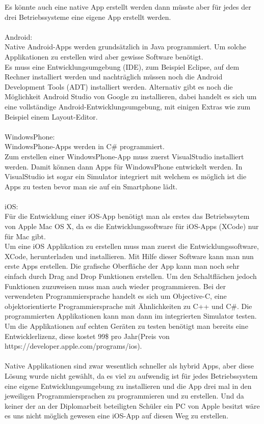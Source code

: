 Es könnte auch eine native App erstellt werden dann müsste aber für jedes der drei Betriebssysteme eine eigene App erstellt werden.\\
\\
Android:\\
Native Android-Apps werden grundsätzlich in Java programmiert. Um solche Applikationen zu erstellen wird aber gewisse Software benötigt.\\
Es muss eine Entwicklungsumgebung (IDE), zum Beispiel Eclipse, auf dem Rechner installiert werden und nachträglich müssen noch die Android Development Tools (ADT) installiert werden. Alternativ gibt es noch die Möglichkeit Android Studio von Google zu installieren, dabei handelt es sich um eine vollständige Android-Entwicklungsumgebung, mit einigen Extras wie zum Beispiel einem Layout-Editor.\\
\\
WindowsPhone:\\
WindowsPhone-Apps werden in C\# programmiert.\\
Zum erstellen einer WindowsPhone-App muss zuerst VisualStudio installiert werden. Damit können dann Apps für WindowsPhone entwickelt werden. In VisualStudio ist sogar ein Simulator integriert mit welchem es möglich ist die Apps zu testen bevor man sie auf ein Smartphone lädt.\\
\\
iOS:\\
Für die Entwicklung einer iOS-App benötigt man als erstes das Betriebssytem von Apple Mac OS X, da es die Entwicklungssoftware für iOS-Apps (XCode) nur für Mac gibt.\\
Um eine iOS Applikation zu erstellen muss man zuerst die Entwicklungssoftware, XCode, herunterladen und installieren. Mit Hilfe dieser Software kann man nun erste Apps erstellen. Die grafische Oberfläche der App kann man noch sehr einfach durch Drag and Drop Funktionen erstellen. Um den Schaltflächen jedoch Funktionen zuzuweisen muss man auch wieder programmieren. Bei der verwendeten Programmiersprache handelt es sich um Objective-C, eine objektorientierte Programmiersprache mit Ähnlichkeiten zu C++ und C\#.
Die programmierten Applikationen kann man dann im integrierten Simulator testen.
Um die Applikationen auf echten Geräten zu testen benötigt man bereits eine Entwicklerlizenz, diese kostet 99\$ pro Jahr(Preis von https://developer.apple.com/programs/ios).\\
\\
Native Applikationen sind zwar wesentlich schneller als hybrid Apps, aber diese Lösung wurde nicht gewählt, da es viel zu aufwendig ist für jedes Betriebssystem eine eigene Entwicklungsumgebung zu installieren und die App drei mal in den jeweiligen Programmiersprachen zu programmieren und zu erstellen. Und da keiner der an der Diplomarbeit beteiligten Schüler ein PC von Apple besitzt wäre es uns nicht möglich gewesen eine iOS-App auf diesen Weg zu erstellen.\\

